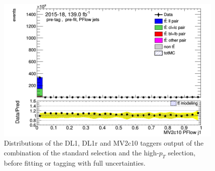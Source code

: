 \documentclass[letterpaper,12pt]{article}
\begin{document}
\begin{figure}[H]
\begin{minipage}[b]{.45\textwidth}
\end{minipage}\hfill
\begin{minipage}[b]{.45\textwidth}
\centering
\includegraphics[width=1\textwidth]{Oct_distributions/pretagNoRwDL1rwithhighpTPFlow_scaledall/DataMC_J1_MV2c10.png}
\end{minipage}
\caption{Distributions of the DL1, DL1r and MV2c10 taggers output of the combination of the standard selection and the high-$p_T$ selection, before fitting or tagging with full uncertainties.} \label{fig:taggers_PFlow}
\end{figure}
\end{document}
